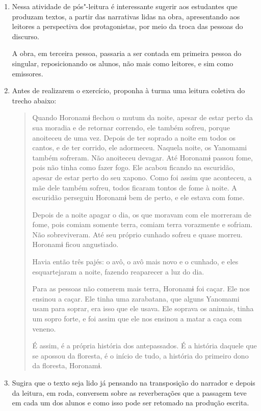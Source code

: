 \documentclass[12pt]{extarticle}
\begin{document}
\begin{enumerate}
\item Nessa atividade de pós"-leitura é interessante sugerir aos estudantes que
produzam textos, a partir das narrativas lidas na obra, apresentando aos leitores a 
perspectiva dos protagonistas, por meio da troca das pessoas do discurso.

A obra, em terceira pessoa, passaria a ser contada em primeira pessoa do singular,
reposicionando os alunos, não mais como leitores, e sim como emissores.

\item Antes de realizarem o exercício, proponha à turma uma leitura coletiva do trecho abaixo:

\begin{quote}
Quando Horonamɨ flechou o mutum da noite, apesar de estar perto da sua moradia e de retornar 
correndo, ele também sofreu, porque anoiteceu de uma vez. Depois de ter soprado a noite em todos
os cantos, e de ter corrido, ele adormeceu. Naquela noite, os Yanomami também sofreram. Não anoiteceu
devagar. Até Horonamɨ passou fome, pois não tinha como fazer fogo. Ele acabou ficando na escuridão, 
apesar de estar perto do seu xapono. Como foi assim que aconteceu, a mãe dele também sofreu, todos 
ficaram tontos de fome à noite. A escuridão perseguiu Horonamɨ bem de perto, e ele estava com fome.

Depois de a noite apagar o dia, os que moravam com ele morreram de fome, pois comiam somente terra,
comiam terra vorazmente e sofriam. Não sobreviveram. Até seu próprio cunhado sofreu e quase morreu. 
Horonamɨ ficou angustiado.

Havia então três pajés: o avô, o avô mais novo e o cunhado, e eles esquartejaram a noite, fazendo 
reaparecer a luz do dia.

Para as pessoas não comerem mais terra, Horonamɨ foi caçar. Ele nos ensinou a caçar. Ele tinha uma 
zarabatana, que alguns Yanomami usam para soprar, era isso que ele usava. Ele soprava os animais, tinha 
um sopro forte, e foi assim que ele nos ensinou a matar a caça com veneno.

É assim, é a própria história dos antepassados. É a história daquele que se apossou da floresta, é o 
início de tudo, a história do primeiro dono da floresta, Horonamɨ.
\end{quote}

\item Sugira que o texto seja lido já pensando na transposição do narrador e depois da leitura, em roda,
conversem sobre as reverberações que a passagem teve em cada um dos alunos e como isso pode ser
retomado na produção escrita.
\end{enumerate}
\end{document}
